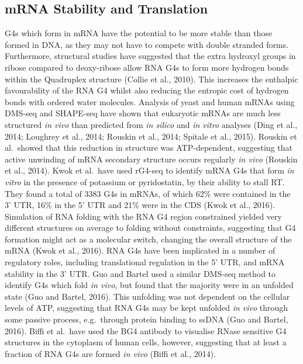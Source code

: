 \documentclass[12pt,a4paper,]{report}
\begin{document}
\newpage

\hypertarget{mrna-stability-and-translation}{%
\subsection{mRNA Stability and
Translation}\label{mrna-stability-and-translation}}

\label{ssec:mrna_stability}

G4s which form in mRNA have the potential to be more stable than those
formed in DNA, as they may not have to compete with double stranded
forms. Furthermore, structural studies have suggested that the extra
hydroxyl groups in ribose compared to deoxy-ribose allow RNA G4s to form
more hydrogen bonds within the Quadruplex structure (Collie et al.,
2010). This increases the enthalpic favourability of the RNA G4 whilst
also reducing the entropic cost of hydrogen bonds with ordered water
molecules. Analysis of yeast and human mRNAs using DMS-seq and SHAPE-seq
have shown that eukaryotic mRNAs are much less structured \emph{in vivo}
than predicted from \emph{in silico} and \emph{in vitro} analyses (Ding
et al., 2014; Loughrey et al., 2014; Rouskin et al., 2014; Spitale et
al., 2015). Rouskin et al.~showed that this reduction in structure was
ATP-dependent, suggesting that active unwinding of mRNA secondary
structure occurs regularly \emph{in vivo} (Rouskin et al., 2014). Kwok
et al.~have used rG4-seq to identify mRNA G4s that form \emph{in vitro}
in the presence of potassium or pyridostatin, by their ability to stall
RT. They found a total of 3383 G4s in mRNAs, of which 62\% were
contained in the 3' UTR, 16\% in the 5' UTR and 21\% were in the CDS
(Kwok et al., 2016). Simulation of RNA folding with the RNA G4 region
constrained yielded very different structures on average to folding
without constraints, suggesting that G4 formation might act as a
molecular switch, changing the overall structure of the mRNA (Kwok et
al., 2016). RNA G4s have been implicated in a number of regulatory
roles, including translational regulation in the 5' UTR, and mRNA
stability in the 3' UTR. Guo and Bartel used a similar DMS-seq method to
identify G4s which fold \emph{in vivo}, but found that the majority were
in an unfolded state (Guo and Bartel, 2016). This unfolding was not
dependent on the cellular levels of ATP, suggesting that RNA G4s may be
kept unfolded \emph{in vivo} through some passive process, e.g.~through
protein binding to ssDNA (Guo and Bartel, 2016). Biffi et al.~have used
the BG4 antibody to visualise RNase sensitive G4 structures in the
cytoplasm of human cells, however, suggesting that at least a fraction
of RNA G4s are formed \emph{in vivo} (Biffi et al., 2014).
\end{document}

